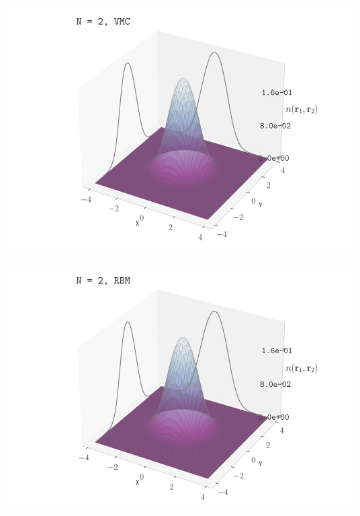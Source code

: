 \begin{figure}[H]
    \centering
    \begin{subfigure}[t]{0.32\textwidth}
        \centering
        \includegraphics[width=\textwidth]{Chapters/Results/dots/density_profile_3d_N2_nqs_VMC_1.0.pdf}
        \label{fig:sub1}
    \end{subfigure}
    \begin{subfigure}[t]{0.32\textwidth}
        \centering
        \includegraphics[width=\textwidth]{Chapters/Results/dots/density_profile_3d_N2_nqs_RBM_1.0.pdf}
        \label{fig:sub2}
    \end{subfigure}
    \begin{subfigure}[t]{0.32\textwidth}
        \centering

\end{subfigure}
\end{figure}
